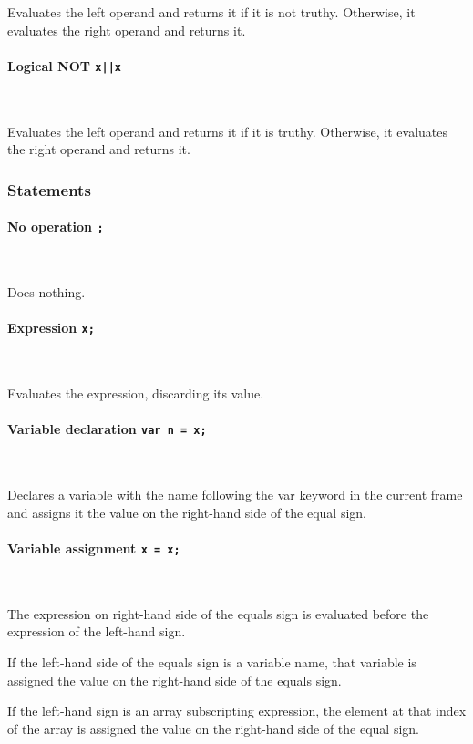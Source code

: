 Evaluates the left operand and returns it if it is not truthy. Otherwise, it evaluates the right operand and returns it.

\paragraph{Logical NOT \quad \texttt{x||x}} \

Evaluates the left operand and returns it if it is truthy. Otherwise, it evaluates the right operand and returns it.

\subsubsection{Statements}

\paragraph{No operation \quad \texttt{;}} \

Does nothing.

\paragraph{Expression \quad \texttt{x;}} \

Evaluates the expression, discarding its value.

\paragraph{Variable declaration \quad \texttt{var n = x;} } \

Declares a variable with the name following the var keyword in the current frame and assigns it the value on the right-hand side of the equal sign.

\paragraph{Variable assignment \quad \texttt{x = x;} } \

The expression on right-hand side of the equals sign is evaluated before the expression of the left-hand sign.

If the left-hand side of the equals sign is a variable name, that variable is assigned the value on the right-hand side of the equals sign.

If the left-hand sign is an array subscripting expression, the element at that index of the array is assigned the value on the right-hand side of the equal sign.

